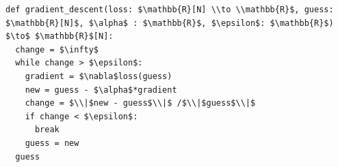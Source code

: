 \documentclass[border=10pt]{standalone}
\begin{document}
\begin{lstlisting}
def gradient_descent(loss: $\mathbb{R}[N] \\to \\mathbb{R}$, guess: $\mathbb{R}[N]$, $\alpha$ : $\mathbb{R}$, $\epsilon$: $\mathbb{R}$) $\to$ $\mathbb{R}$[N]:
  change = $\infty$
  while change > $\epsilon$:
    gradient = $\nabla$loss(guess)
    new = guess - $\alpha$*gradient
    change = $\\|$new - guess$\\|$ /$\\|$guess$\\|$
    if change < $\epsilon$:
      break
    guess = new
  guess
\end{lstlisting}
\end{document}
